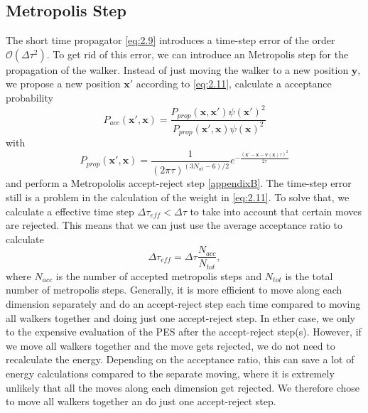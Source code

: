 \documentclass [12pt]{report}
\begin{document}
\subsection{Metropolis Step} \label{metro}
The short time propagator \eqref{eq:2.9} introduces a time-step error of the order $\mathcal{O}(\Delta \tau^2)$. To get rid of this error, we can introduce an Metropolis step for the propagation of the walker. Instead of just moving the walker to a new position $\bm{y}$, we propose a new position $\bm{x}'$ according to \eqref{eq:2.11}, calculate a acceptance probability 
\begin{equation}\label{Pacc}
P_{acc}(\bm{x}',\bm{x}) = \frac{P_{prop}(\bm{x},\bm{x}') \psi(\bm{x}')^2}{P_{prop}(\bm{x}',\bm{x}) \psi(\bm{x})^2}
\end{equation}
with
\begin{equation}\label{Pprop}
P_{prop}(\bm{x}',\bm{x}) = \frac{1}{(2\pi\tau)^{(3N_{at}-6)/2}} e^{-\frac{(\bm{x}'-\bm{x}-\bm{v}(\bm{x})\tau)^2}{2\tau}}
\end{equation}
and perform a Metropololis accept-reject step \ref{appendixB}.
The time-step error still is a problem in the calculation of the weight in \eqref{eq:2.11}. To solve that, we calculate a effective time step $\Delta \tau_{eff} < \Delta \tau$ to take into account that certain moves are rejected. This means that we can just use the average acceptance ratio to calculate
\begin{equation}\label{tau_eff}
\Delta \tau_{eff} = \Delta \tau \frac{N_{acc}}{N_{tot}},
\end{equation}
where $N_{acc}$ is the number of accepted metropolis steps and $N_{tot}$ is the total number of metropolis steps.
Generally, it is more efficient to move along each dimension separately and do an accept-reject step each time compared to moving all walkers together and doing just one accept-reject step. In ether case, we only to the expensive evaluation of the PES after the accept-reject step(s). However, if we move all walkers together and the move gets rejected, we do not need to recalculate the energy. Depending on the acceptance ratio, this can save a lot of energy calculations compared to the separate moving, where it is extremely unlikely that all the moves along each dimension get rejected. We therefore chose to move all walkers together an do just one accept-reject step.
\end{document}
